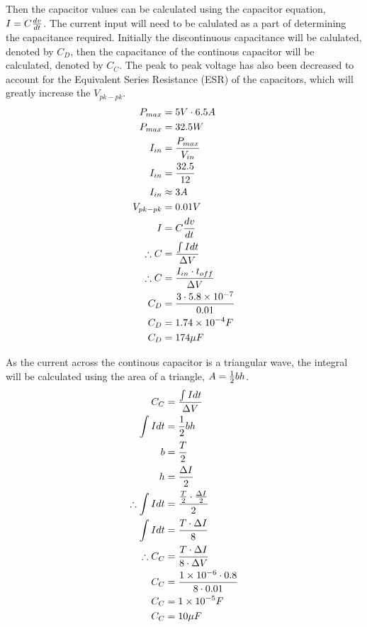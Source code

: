 Then the capacitor values can be calculated using the capacitor equation, $I = {C {{dv} \over {dt}}}$. The current input will need to be calulated as a part of determining the capacitance required. Initially the discontinuous capacitance will be calulated, denoted by $C_D$, then the capacitance of the continous capacitor will be calculated, denoted by $C_C$. The peak to peak voltage has also been decreased to account for the Equivalent Series Resistance (ESR) of the capacitors, which will greatly increase the $V_{pk-pk}$.
\begin{align}
    P_{max} &= 5V \cdot 6.5A \\
    P_{max} &= 32.5W \\
    I_{in} &= {{P_{max}} \over {V_{in}}} \\
    I_{in} &= {{32.5} \over {12}} \\
    I_{in} &\approx 3A \\
    V_{pk-pk} &= 0.01V \\
    I &= {C {{dv} \over {dt}}} \\
    \therefore C &= {{\int I dt} \over {\Delta V}} \\
    \therefore C &= {{I_{in} \cdot t_{off}} \over {\Delta V}} \\
    C_D &= {{3 \cdot 5.8 \times 10^{-7}} \over {0.01}} \\
    C_D &= 1.74 \times 10^{-4} F \\
    C_D &= 174 \mu F
\end{align}

As the current across the continous capacitor is a triangular wave, the integral will be calculated using the area of a triangle, $A = {{{1} \over {2}} bh}$.
\begin{align}
    C_C &= {{\int I dt} \over {\Delta V}} \\
    \int I dt &= {{{1} \over {2}} bh} \\
    b &= {T \over 2} \\ 
    h &= {{\Delta I} \over {2}} \\
    \therefore \int I dt &= {{{T \over 2} \cdot {{\Delta I} \over 2}} \over {2}} \\
    \int I dt &= {{T \cdot \Delta I} \over 8} \\
    \therefore C_C &= {{T \cdot \Delta I} \over {8 \cdot \Delta V}} \\
    C_C &= {{1 \times 10^{-6} \cdot 0.8} \over {8 \cdot 0.01}} \\
    C_C &= 1 \times 10^{-5} F \\
    C_C &= 10 \mu F
\end{align}